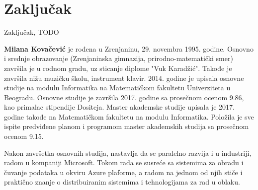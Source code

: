 \documentclass[12pt,oneside]{memoir}
\begin{document}
\section{Zaključak}
Zaključak, TODO

\literatura

\backmatter

\begin{biografija}
  \textbf{Milana Kovačević} je rođena u Zrenjaninu, 29. novembra 1995. godine. Osnovno i srednje obrazovanje (Zrenjaninska gimnazija, prirodno-matematički smer) završila je u rodnom gradu, uz sticanje diplome "Vuk Karadžić". Takođe je završila nižu muzičku školu, instrument klavir.
2014. godine je upisala osnovne studije na modulu Informatika na Matematičkom fakultetu Univerziteta u Beogradu. Osnovne studije je završila 2017. godine sa prosečnom ocenom 9.86, kao primalac stipendije Dositeja. Master akademske studije upisala je 2017. godine takođe na Matematičkom fakultetu na modulu Informatika. Položila je sve ispite predviđene planom i programom master akademskih studija sa prosečnom ocenom 9.15.

Nakon završetka osnovnih studija, nastavlja da se paralelno razvija i u industriji, radom u kompaniji Microsoft. Tokom rada se susreće sa sistemima za obradu i čuvanje podataka u okviru Azure plaforme, a radom na jednom od njih stiče i praktično znanje o distribuiranim sistemima i tehnologijama za rad u oblaku.

\end{biografija}
\end{document}
